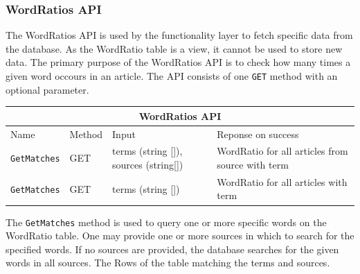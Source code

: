 \subsubsection{WordRatios API}
The WordRatios API is used by the functionality layer to fetch specific data from the database.
As the WordRatio table is a view, it cannot be used to store new data. 
The primary purpose of the WordRatios API is to check how many times a given word occours in an article.
The API consists of one \texttt{GET} method with an optional parameter. 
\begin{table}[h]
    \begin{tabular}{|llll|}
    \hline
    \multicolumn{4}{|c|}{\textbf{WordRatios API}}                                                                                                                                           \\ \hline
    \multicolumn{1}{|l|}{Name}                      & \multicolumn{1}{l|}{Method} & \multicolumn{1}{l|}{Input}                           & Reponse on success                               \\ \hline
    \multicolumn{1}{|l|}{\texttt{GetMatches}}       & \multicolumn{1}{l|}{GET}    & \multicolumn{1}{l|}{terms (string []), sources (string[])} & WordRatio for all articles from source with term \\ \hline
    \multicolumn{1}{|l|}{\texttt{GetMatches}}       & \multicolumn{1}{l|}{GET}    & \multicolumn{1}{l|}{terms (string [])}                   & WordRatio for all articles with term             \\ \hline
    \end{tabular}
    \end{table}
The \texttt{GetMatches} method is used to query one or more specific words on the WordRatio table.
One may provide one or more sources in which to search for the specified words.
If no sources are provided, the database searches for the given words in all sources.
The Rows of the table matching the terms and sources.

